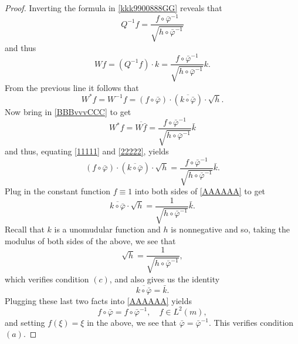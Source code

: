 \documentclass{dis}
\theoremstyle{plain}
\theoremstyle{definition}
\renewcommand{\phi}{\varphi}
\newcommand{\0}{{\color{lightgray}0}}
\begin{document}
\begin{proof}
Inverting the formula in \eqref{kkk9900888GG} reveals that 
$$Q^{-1} f  =  \frac{f \circ \bar \phi^{-1}}{\sqrt{h \circ\bar  \phi^{-1}}}$$
and thus
\begin{equation}\label{BBBBB}
W f  = (Q^{-1} f) \cdot k =  \frac{f \circ \bar \phi^{-1}}{\sqrt{h \circ \bar \phi^{-1}}}k.
\end{equation}
From the previous line it follows that 
\begin{equation}\label{11111}
W^{*} f  = W^{-1} f = (f \circ \bar \phi) \cdot (\overline{k \circ \bar \phi}) \cdot \sqrt{h}.
\end{equation}
Now bring in \eqref{BBBvvvCCC} to get
\begin{equation}\label{22222}
W^{*} f  = \overline{W\bar f} =  \frac{f \circ  \bar \phi^{-1}}{\sqrt{h \circ \bar  \phi^{-1}}} \bar k
\end{equation}
and thus, equating \eqref{11111} and \eqref{22222}, yields
\begin{equation}\label{AAAAAA}
 (f \circ \bar \phi) \cdot (\overline{k \circ \bar \phi}) \cdot \sqrt{h} =  \frac{f \circ  \bar \phi^{-1}}{\sqrt{h \circ \bar  \phi^{-1}}} \bar k.
\end{equation}
Plug in the constant function $f \equiv 1$ into both sides of \eqref{AAAAAA} to get 
$$ \overline{k \circ \bar \phi} \cdot  \sqrt{h} = \frac{1}{\sqrt{h \circ \bar \phi^{-1}}} \bar k.$$
Recall that $k$ is a unomudular function and $h$ is nonnegative and so, taking the modulus of both sides of the above, we see that 
$$\sqrt{h} = \frac{1}{\sqrt{h \circ \bar \phi^{-1}}},$$
which verifies condition $(c)$, and also gives us the identity
$$  \overline{k \circ \bar \phi}=  \bar k.$$
Plugging these last two facts into \eqref{AAAAAA} yields 
$$f \circ \bar \phi = f \circ \bar \phi^{-1}, \quad f \in L^2(m),$$
and setting $f(\xi) = \xi$ in the above, we see that 
$\bar \phi = \bar \phi^{-1}.$
This verifies condition $(a)$.


\end{proof}
\end{document}
